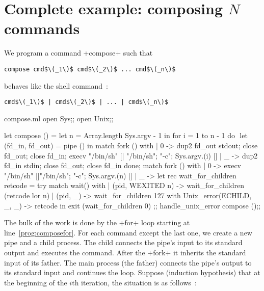 \section{Complete example: composing $N$ commands}

We program a command \ml+compose+ such that 
\begin{lstlisting}
compose cmd$\(_1\)$ cmd$\(_2\)$ ... cmd$\(_n\)$ 
\end{lstlisting}
behaves like the shell command~:
\begin{lstlisting}
cmd$\(_1\)$ | cmd$\(_2\)$ | ... | cmd$\(_n\)$
\end{lstlisting}
\begin{listingcodefile}[style=numbers]{compose.ml}
open Sys;;
open Unix;;

let compose () =
  let n = Array.length Sys.argv - 1 in
  for i = 1 to n - 1 do $\label{prog:composefor}$
    let (fd_in, fd_out) = pipe () in
    match fork () with
    | 0 ->
        dup2 fd_out stdout;
        close fd_out;
        close fd_in;
        execv "/bin/sh" [| "/bin/sh"; "-c"; Sys.argv.(i) |]
    | _ ->
        dup2 fd_in stdin;
        close fd_out;
        close fd_in
  done;
  match fork () with
  | 0 -> execv "/bin/sh" [|"/bin/sh"; "-c"; Sys.argv.(n) |]
  | _ ->
      let rec wait_for_children retcode =
        try
          match wait() with
          | (pid, WEXITED n) -> wait_for_children (retcode lor n)
          | (pid, _)         -> wait_for_children 127
        with
          Unix_error(ECHILD, _, _) -> retcode in
      exit (wait_for_children 0)
;;
handle_unix_error compose ();;
\end{listingcodefile}
% 
The bulk of the work is done by the \ml+for+ loop starting at
line~\ref{prog:composefor}. For each command except the last one, we
create a new pipe and a child process. The child connects the pipe's
input to its standard output and executes the command. After the
\ml+fork+ it inherits the standard input of its father. The main
process (the father) connects the pipe's output to its standard input
and continues the loop. Suppose (induction hypothesis) that at the
beginning of the $i$th iteration, the situation is as follows~:
%
